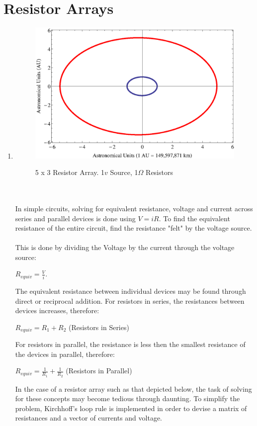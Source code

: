 \documentclass{report}
\begin{document}
\section{Resistor Arrays}
\begin{enumerate}
\item 
\begin{figure}[H]
\centering \caption{5 x 3 Resistor Array. 1$v$ Source, 1$\Omega$ Resistors}
\includegraphics[scale=.92]{sej.eps}
\label{sej}
\end{figure}
\\
\\In simple circuits, solving for equivalent resistance, voltage and current across series and parallel devices is done using $\displaystyle V=iR$. To find the equivalent resistance of the entire circuit, find the resistance "felt" by the voltage source. 
\\
\\This is done by dividing the Voltage by the current through the voltage source: 
\begin{center}
$\displaystyle R_{equiv}=\frac{V}{i}$. 
\end{center}
The equivalent resistance between individual devices may be found through direct or reciprocal addition. For resistors in series, the resistances between devices increases, therefore: 
\begin{center}
$\displaystyle R_{equiv} = R_1 + R_2$ (Resistors in Series)
\end{center}
For resistors in parallel, the resistance is less then the smallest resistance of the devices in parallel, therefore:  
\begin{center}
$\displaystyle R_{equiv}=\frac{1}{R_1} + \frac{1}{R_2}$ (Resistors in Parallel)
\end{center}
In the case of a resistor array such as that depicted below, the task of solving for these concepts may become tedious through daunting. To simplify the problem, Kirchhoff's loop rule is implemented in order to devise a matrix of resistances and a vector of currents and voltage. 


\end{enumerate}
\end{document}
